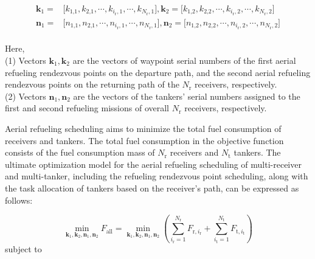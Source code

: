 \begin{equation*}
\begin{aligned}\mathbf{k}_1=&\Big[k_\text{1,1},k_\text{2,1},\cdots,k_{i_\text{r},1},\cdots,k_{N_\text{r},1}\Big],\mathbf{k}_2=\Big[k_\text{1,2},k_\text{2,2},\cdots,k_{i_\text{r},2},\cdots,k_{N_\text{r},2}\Big]\\\mathbf{n}_1=&\Big[n_\text{1,1},n_\text{2,1},\cdots,n_{i_\text{r},1},\cdots,n_{N_\text{r},1}\Big],\mathbf{n}_2=\Big[n_\text{1,2},n_\text{2,2},\cdots,n_{i_\text{r},2},\cdots,n_{N_\text{r},2}\Big]\end{aligned}
\end{equation*}\\Here,\\(1)	Vectors $\mathbf{k}_1,\mathbf{k}_2$   are the vectors of waypoint serial numbers of the first aerial refueling rendezvous points on the departure path, and the second aerial refueling rendezvous points on the returning path of the $N_\text{r}$ receivers, respectively.\\(2)	Vectors $\mathbf{n}_1,\mathbf{n}_2$  are the vectors of the tankers' serial numbers assigned to the first and second refueling missions of overall $N_\text{r}$ receivers, respectively.

Aerial refueling scheduling aims to minimize the total fuel consumption of receivers and tankers. The total fuel consumption in the objective function consists of the fuel consumption mass of $N_\text{r}$ receivers and $N_\text{t}$ tankers. The ultimate optimization model for the aerial refueling scheduling of multi-receiver and multi-tanker, including the refueling rendezvous point scheduling, along with the task allocation of tankers based on the receiver's path, can be expressed as follows:

\begin{equation}
\min_{\mathbf{k}_1,\mathbf{k}_2,\mathbf{n}_1,\mathbf{n}_2}F_{\text{all}}=\min_{\mathbf{k}_1,\mathbf{k}_2,\mathbf{n}_1,\mathbf{n}_2}\left(\sum_{i_\text{r}=1}^{N_\text{r}}F_{\text{r},i_\text{r}}+\sum_{i_\text{t}=1}^{N_\text{t}}F_{\text{t},i_\text{t}}\right)
\label{eq:15.32}
\end{equation}
subject to

